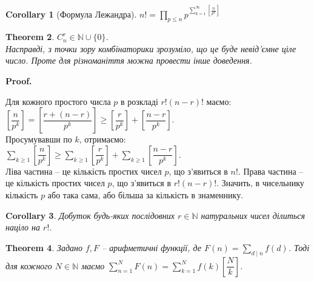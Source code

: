 \documentclass[a4paper, 10pt]{article}
\makeatletter
\theoremstyle{theoremdd}
\newtheorem{theorem}{Theorem}[subsection]
\theoremstyle{theoremdd}
\theoremstyle{theoremdd}
\theoremstyle{theoremdd}
\theoremstyle{theoremdd}
\theoremstyle{theoremdd}
\theoremstyle{theoremdd}
\theoremstyle{theoremdd}
\newtheorem{corollary}[theorem]{Corollary}
\renewenvironment{proof}[1][Proof.\\]{\par
\pushQED{\hfill \qed}%
\normalfont \topsep6\p@\@plus6\p@\relax
\trivlist
\item\relax
{\bfseries
#1\@addpunct{.}}\hspace\labelsep\ignorespaces
}{%
\popQED\endtrivlist\@endpefalse
}
\makeatother
\begin{document}
\begin{corollary}[Формула Лежандра]
$n! = \displaystyle\prod_{p \leq n} p^{\textstyle \sum_{k=1}^\infty \left[ \frac{n}{p^k} \right]}$
\end{corollary}

\begin{theorem}
\label{C_n^r is positive integer}
$C_n^r \in \mathbb{N} \cup \{0\}$.\\
\textit{Насправді, з точки зору комбінаторики зрозуміло, що це буде невід'ємне ціле число. Проте для різноманіття можна провести інше доведення.}
\end{theorem}

\begin{proof}
Для кожного простого числа $p$ в розкладі $r!(n-r)!$ маємо:\\
$\left[ \dfrac{n}{p^k} \right] = \left[ \dfrac{r+(n-r)}{p^k} \right] \geq \left[ \dfrac{r}{p^k} \right] + \left[ \dfrac{n-r}{p^k} \right]$.\\
Просумувавши по $k$, отримаємо:\\
$\displaystyle\sum_{k \geq 1}\left[ \dfrac{n}{p^k} \right] \geq \sum_{k \geq 1}\left[ \dfrac{r}{p^k} \right] + \sum_{k \geq 1}\left[ \dfrac{n-r}{p^k} \right]$.\\
Ліва частина -- це кількість простих чисел $p$, що з'явиться в $n!$. Права частина -- це кількість простих чисел $p$, що з'явиться в $r!(n-r)!$. Значить, в чисельнику кількість $p$ або така сама, або більша за кількість в знаменнику.
\end{proof}

\begin{corollary}
Добуток будь-яких послідовних $r \in \mathbb{N}$ натуральних чисел ділиться націло на $r!$.
\end{corollary}

\begin{theorem}
Задано $f,F$ -- арифметичні функції, де $F(n) = \displaystyle\sum_{d \mid n} f(d)$. Тоді для кожного $N \in \mathbb{N}$ маємо $\displaystyle\sum_{n=1}^N F(n) = \sum_{k=1}^N f(k) \left[ \dfrac{N}{k} \right]$.
\end{theorem}
\end{document}
